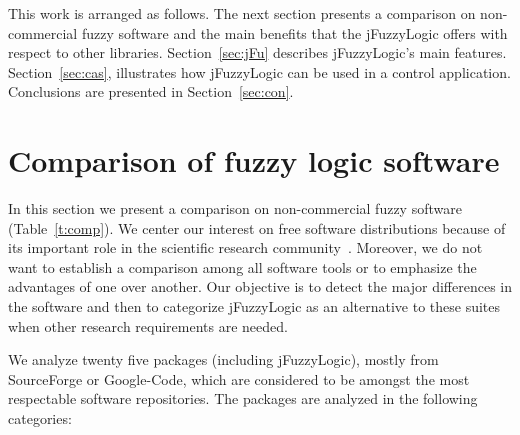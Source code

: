 \documentclass[conference]{IEEEtran}
\begin{document}
This work is arranged as follows.
The next section presents a comparison on non-commercial fuzzy software and the main benefits that the jFuzzyLogic offers with respect to other libraries. 
Section~\ref{sec:jFu} describes jFuzzyLogic's main features. 
Section~\ref{sec:cas}, illustrates how jFuzzyLogic can be used in a control application.
Conclusions are presented in Section~\ref{sec:con}.

\section{Comparison of fuzzy logic software}
\label{sec:stu}

In this section we present a comparison on non-commercial fuzzy software (Table~\ref{t:comp}).
We center our interest on free software distributions because of its important role in the scientific research community~\cite{Sonnenburg07}.
Moreover, we do not want to establish a comparison among all software tools or to emphasize the advantages of one over another.
Our objective is to detect the major differences in the software and then to categorize jFuzzyLogic as an alternative to these suites when other research requirements are needed.

We analyze twenty five packages (including jFuzzyLogic), mostly from SourceForge or Google-Code, which are considered to be amongst the most respectable software repositories.
The packages are analyzed in the following categories:
\end{document}
